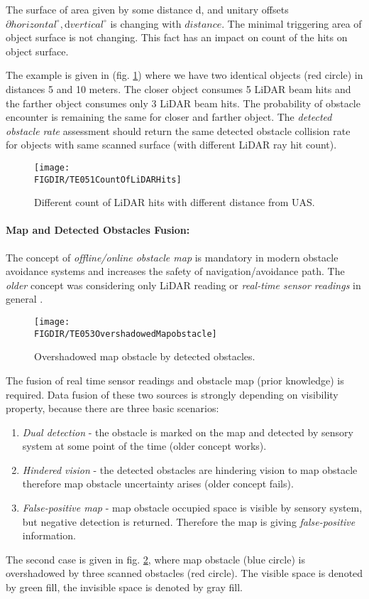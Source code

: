 The surface of area given by some distance d, and unitary offsets$\partial horizontal^\circ, \text{d} vertical^\circ$  is changing with $distance$. The minimal triggering area of object surface is not changing. This fact has an impact on count of the hits on object surface. 

The example is given in (fig. \ref{fig:P01CountOfLiDARHits}) where we have two identical objects (red circle) in distances 5 and 10 meters. The closer object consumes 5 LiDAR beam hits and the farther object consumes only 3 LiDAR beam hits. The probability of obstacle encounter is remaining the same for closer and farther object. The \emph{detected obstacle rate} assessment should return the same  detected obstacle collision rate for objects with same scanned surface (with different LiDAR ray hit count).

\begin{figure}[H]
    \centering
    \texttt{[image: \\FIGDIR/TE051CountOfLiDARHits]}
    \caption{Different count of LiDAR hits with different distance from UAS.}
    \label{fig:P01CountOfLiDARHits}
\end{figure}


\paragraph{Map and Detected Obstacles Fusion:} The concept of \emph{offline/online obstacle map} is mandatory in modern obstacle avoidance systems and increases the safety of navigation/avoidance path. The \emph{older} concept was considering only LiDAR reading or \emph{real-time sensor readings} in general \cite{gomola2017probabilistic}. 

\begin{figure}[htbp]
    \centering
    \texttt{[image: \\FIGDIR/TE053OvershadowedMapobstacle]}
    \caption{Overshadowed map obstacle by detected obstacles.}
    \label{fig:P02OvershadowedMapobstacle}
\end{figure}

\newpage\noindent The fusion of real time sensor readings and obstacle map (prior knowledge) is required. Data fusion of these two sources is strongly depending on visibility property, because there are three basic scenarios:

\begin{enumerate}
    \item \emph{Dual detection} - the obstacle is marked on the map and detected by sensory system at some point of the time (older concept works).
    
    \item \emph{Hindered vision} - the detected obstacles are hindering vision to map obstacle therefore map obstacle uncertainty arises (older concept fails). 
    
    \item \emph{False-positive map} - map obstacle occupied space is visible by sensory system, but negative detection is returned. Therefore the map is giving \emph{false-positive} information.
\end{enumerate}

\noindent The second case is given in fig. \ref{fig:P02OvershadowedMapobstacle}, where map obstacle (blue circle) is overshadowed by three scanned obstacles (red circle). The visible space is denoted by green fill, the invisible space is denoted by gray fill. 